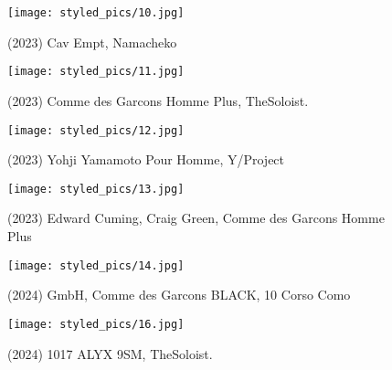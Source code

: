 \begin{minipage}[h!]{0.5\textwidth}
    \begin{figure}[H]
        \texttt{[image: styled\_pics/10.jpg]}
        \caption*{(2023) Cav Empt, Namacheko}
    \end{figure}
\end{minipage}
\begin{minipage}[h!]{0.5\textwidth}
    \begin{figure}[H]
        \texttt{[image: styled\_pics/11.jpg]}
        \caption*{(2023) Comme des Garcons Homme Plus, TheSoloist.}
    \end{figure}
\end{minipage}
\begin{minipage}[h!]{0.5\textwidth}
    \begin{figure}[H]
        \texttt{[image: styled\_pics/12.jpg]}
        \caption*{(2023) Yohji Yamamoto Pour Homme, Y/Project}
    \end{figure}
\end{minipage}
\begin{minipage}[h!]{0.5\textwidth}
    \begin{figure}[H]
        \texttt{[image: styled\_pics/13.jpg]}
        \caption*{(2023) Edward Cuming, Craig Green, Comme des Garcons Homme Plus}
    \end{figure}
\end{minipage}
\begin{minipage}[h!]{0.5\textwidth}
    \begin{figure}[H]
        \texttt{[image: styled\_pics/14.jpg]}
        \caption*{(2024) GmbH, Comme des Garcons BLACK, 10 Corso Como}
    \end{figure}
\end{minipage}
\begin{minipage}[h!]{0.5\textwidth}
    \begin{figure}[H]
        \texttt{[image: styled\_pics/16.jpg]}
        \caption*{(2024) 1017 ALYX 9SM, TheSoloist.}
    \end{figure}
\end{minipage} 


